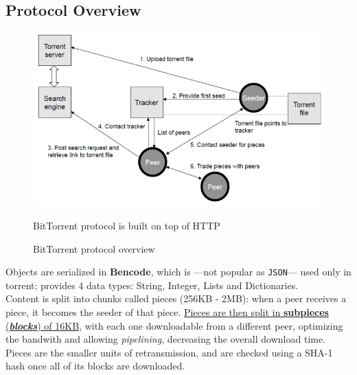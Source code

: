 \subsection{Protocol Overview}
\begin{figure}[htbp]
   \centering
   \includegraphics{images/bit_overview.png}
   \caption{BitTorrent protocol overview}
   \label{fig:bit_overview}
   BitTorrent protocol is built on top of HTTP
\end{figure}

Objects are serialized in \textbf{Bencode}, which is ---not popular as \texttt{JSON}--- used only in torrent; provides 4 data types: String, Integer, Lists and Dictionaries.\\
Content is split into chunks called pieces (256KB - 2MB):
when a peer receives a piece, it becomes the seeder of that piece.
\ul{Pieces are then split in \textbf{subpieces} (\textit{\textbf{blocks}}) of 16KB}, with each one downloadable from a different peer, optimizing the bandwith and allowing \textit{pipelining}, decreasing the overall download time.
Pieces are the smaller units of retransmission, and are checked using a SHA-1 hash once all of its blocks are downloaded.

